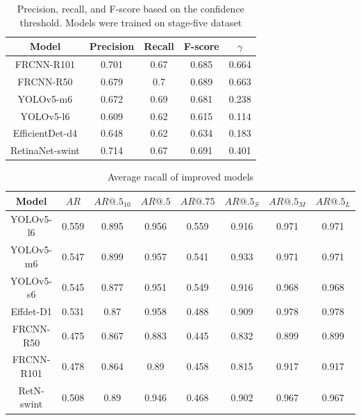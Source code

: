 \begin{table}[H]
    \begin{tabular}{|c|c|c|c|c|}
        \hline
        Model           & Precision & Recall & F-score & $\gamma$ \\ \hline
        FRCNN-R101      & 0.701     & 0.67   & 0.685   & 0.664    \\ \hline
        FRCNN-R50       & 0.679     & 0.7    & 0.689   & 0.663    \\ \hline
        YOLOv5-m6       & 0.672     & 0.69   & 0.681   & 0.238    \\ \hline
        YOLOv5-l6       & 0.609     & 0.62   & 0.615   & 0.114    \\ \hline
        EfficientDet-d4 & 0.648     & 0.62   & 0.634   & 0.183    \\ \hline
        RetinaNet-swint & 0.714     & 0.67   & 0.691   & 0.401    \\ \hline
    \end{tabular}
    \caption{Precision, recall, and F-score based on the confidence threshold. Models were trained on stage-five dataset}
    \label{tab:model_prf:stage_five}
\end{table}


\begin{table}[H]
    \centering
    \begin{tabular}{|c|c|c|c|c|c|c|c|}
        \hline
        Model      & $AR$  & $AR@.5_{10}$ & $AR@.5$ & $AR@.75$ & $AR@.5_S$ & $AR@.5_M$ & $AR@.5_L$ \\ \hline
        YOLOv5-l6  & 0.559 & 0.895        & 0.956   & 0.559    & 0.916     & 0.971     & 0.971     \\ \hline
        YOLOv5-m6  & 0.547 & 0.899        & 0.957   & 0.541    & 0.933     & 0.971     & 0.971     \\ \hline
        YOLOv5-s6  & 0.545 & 0.877        & 0.951   & 0.549    & 0.916     & 0.968     & 0.968     \\ \hline
        Effdet-D1  & 0.531 & 0.87         & 0.958   & 0.488    & 0.909     & 0.978     & 0.978     \\ \hline
        FRCNN-R50  & 0.475 & 0.867        & 0.883   & 0.445    & 0.832     & 0.899     & 0.899     \\ \hline
        FRCNN-R101 & 0.478 & 0.864        & 0.89    & 0.458    & 0.815     & 0.917     & 0.917     \\ \hline
        RetN-swint & 0.508 & 0.89         & 0.946   & 0.468    & 0.902     & 0.967     & 0.967     \\ \hline
    \end{tabular}
    \caption{Average racall of improved models}
    \label{tab:improved:recall}
\end{table}


